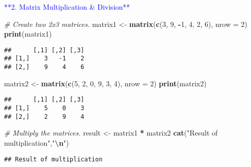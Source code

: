 \documentclass[
]{article}
\newenvironment{Shaded}{\begin{snugshade}}{\end{snugshade}}
\newcommand{\AttributeTok}[1]{\textcolor[rgb]{0.13,0.29,0.53}{#1}}
\newcommand{\CommentTok}[1]{\textcolor[rgb]{0.56,0.35,0.01}{\textit{#1}}}
\newcommand{\DecValTok}[1]{\textcolor[rgb]{0.00,0.00,0.81}{#1}}
\newcommand{\FunctionTok}[1]{\textcolor[rgb]{0.13,0.29,0.53}{\textbf{#1}}}
\newcommand{\NormalTok}[1]{#1}
\newcommand{\OtherTok}[1]{\textcolor[rgb]{0.56,0.35,0.01}{#1}}
\newcommand{\SpecialCharTok}[1]{\textcolor[rgb]{0.81,0.36,0.00}{\textbf{#1}}}
\newcommand{\StringTok}[1]{\textcolor[rgb]{0.31,0.60,0.02}{#1}}
\begin{document}
\textcolor{blue}{**2. Matrix Multiplication & Division**}

\begin{Shaded}
\begin{Highlighting}[]
\CommentTok{\# Create two 2x3 matrices.}
\NormalTok{matrix1 }\OtherTok{\textless{}{-}} \FunctionTok{matrix}\NormalTok{(}\FunctionTok{c}\NormalTok{(}\DecValTok{3}\NormalTok{, }\DecValTok{9}\NormalTok{, }\SpecialCharTok{{-}}\DecValTok{1}\NormalTok{, }\DecValTok{4}\NormalTok{, }\DecValTok{2}\NormalTok{, }\DecValTok{6}\NormalTok{), }\AttributeTok{nrow =} \DecValTok{2}\NormalTok{)}
\FunctionTok{print}\NormalTok{(matrix1)}
\end{Highlighting}
\end{Shaded}

\begin{verbatim}
##      [,1] [,2] [,3]
## [1,]    3   -1    2
## [2,]    9    4    6
\end{verbatim}

\begin{Shaded}
\begin{Highlighting}[]
\NormalTok{matrix2 }\OtherTok{\textless{}{-}} \FunctionTok{matrix}\NormalTok{(}\FunctionTok{c}\NormalTok{(}\DecValTok{5}\NormalTok{, }\DecValTok{2}\NormalTok{, }\DecValTok{0}\NormalTok{, }\DecValTok{9}\NormalTok{, }\DecValTok{3}\NormalTok{, }\DecValTok{4}\NormalTok{), }\AttributeTok{nrow =} \DecValTok{2}\NormalTok{)}
\FunctionTok{print}\NormalTok{(matrix2)}
\end{Highlighting}
\end{Shaded}

\begin{verbatim}
##      [,1] [,2] [,3]
## [1,]    5    0    3
## [2,]    2    9    4
\end{verbatim}

\begin{Shaded}
\begin{Highlighting}[]
\CommentTok{\# Multiply the matrices.}
\NormalTok{result }\OtherTok{\textless{}{-}}\NormalTok{ matrix1 }\SpecialCharTok{*}\NormalTok{ matrix2}
\FunctionTok{cat}\NormalTok{(}\StringTok{"Result of multiplication"}\NormalTok{,}\StringTok{"}\SpecialCharTok{\textbackslash{}n}\StringTok{"}\NormalTok{)}
\end{Highlighting}
\end{Shaded}

\begin{verbatim}
## Result of multiplication
\end{verbatim}
\end{document}
